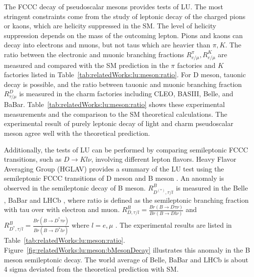 The FCCC decay of pseudoscalar mesons provides tests of LU.  The most stringent constraints come from the study of leptonic decay of the charged pions or kaons, which are helicity suppressed in the SM.  The level of helicity suppression depends on the mass of the outcoming lepton. Pions and kaons can decay into electrons and muons, but not taus which are heavier than $\pi, K$. The ratio between the electronic and muonic branching fractions $R^\pi_{e/\mu},R^K_{e/\mu}$ are measured and compared with the SM prediction in the $\pi$ factories \cite{Numao:1992ve, Britton:1992pg, Aguilar-Arevalo:2015cdf, Czapek:1993kc} and $K$ factories \cite{Lazzeroni:2012cx, Ambrosino:2009aa} listed in Table~\ref{tab:relatedWorks:lu:meson:ratio}. For D meson, tauonic decay is possible, and the ratio between tauonic and muonic branching fraction $R^D_{\tau/\mu}$ is measured in the charm factories including CLEO, BASIII, Belle, and BaBar. Table~\ref{tab:relatedWorks:lu:meson:ratio} shows these experimental measurements and the comparison to the SM theoretical calculations. The experimental result of purely leptonic decay of light and charm pseudoscalar meson agree well with the theoretical prediction. 

Additionally, the tests of LU can be performed by comparing semileptonic FCCC transitions, such as $D\to K l\nu$, involving different lepton flavors. Heavy Flavor Averaging Group (HGLAV) provides a summary of the LU test using the semileptonic FCCC transitions of D meson and B meson \cite{Amhis:2019ckw}. An anomaly is observed in the semileptonic decay of B meson. $R^{B}_{D^{(*)}, \tau/l}$ is measured in the Belle \cite{Huschle:2015rga, Sato:2016svk, Hirose:2016wfn}, BaBar  \cite{Lees:2012xj, Lees:2013uzd} and LHCb \cite{Aaij:2015yra,Aaij:2017uff, Aaij:2017deq}, where ratio is defined as the semileptonic branching fraction with tau over with electron and muon. $R^{B}_{D, \tau/l} = \frac{Br(B\to D\tau \nu)}{Br(B\to Dl \nu)}$ and $R^{B}_{D^*, \tau/l} = \frac{Br(B\to D^*\tau \nu)}{Br(B\to D^*l \nu)}$ where $l=e,\mu$ . The experimental results are listed in Table~\ref{tab:relatedWorks:lu:meson:ratio}. Figure~\ref{fig:relatedWorks:lu:meson:bMesonDecay} illustrates this anomaly in the B meson semileptonic decay. The world average of  Belle, BaBar and LHCb is about 4 sigma deviated from the theoretical prediction with SM.




